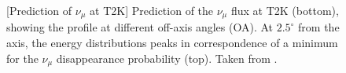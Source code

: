 \begin{figure}[t]
\begin{minipage}[t]{0.48\textwidth}
		[Prediction of $\nu_\mu$ at T2K]%
		{Prediction of the $\nu_\mu$ flux at T2K (bottom), %
		showing the profile at different off-axis angles (OA).
		At $2.5^\circ$ from the axis, the energy distributions peaks %
		in correspondence of a minimum for the $\nu_\mu$ disappearance probability (top).
	       	Taken from .}
		\label{fig:t2k_flux}
	\end{minipage}
\end{figure}




